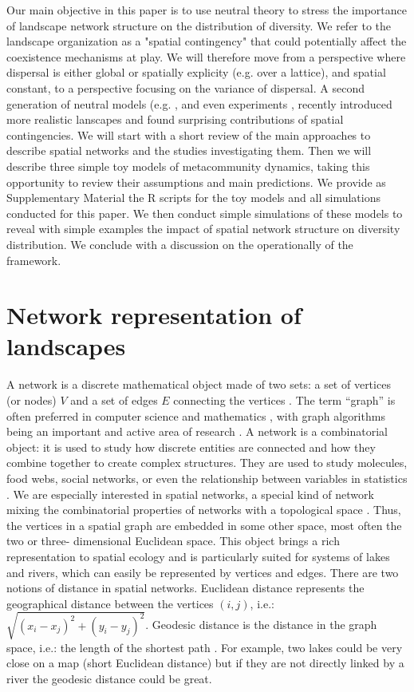 \documentclass[12pt]{article}
\begin{document}
Our main objective in this paper is to use neutral theory to stress the
importance of landscape network structure on the distribution of diversity. We
refer to the landscape organization as a "spatial contingency"
\parencite{Peres-Neto2013} that could potentially affect the coexistence
mechanisms at play. We will therefore move from a perspective where dispersal is
either global or spatially explicity (e.g. over a lattice), and spatial
constant, to a perspective focusing on the variance of dispersal. A second
generation of neutral models (e.g. \textcite{Economo2008,
Economo2011,Desjardins2012a,Desjardins2012b}, and even experiments
\parencite{Altermat2012}, recently introduced more realistic lanscapes and found
surprising contributions of spatial contingencies. We will start with a short
review of the main approaches to describe spatial networks and the studies
investigating them. Then we will describe three simple toy models of
metacommunity dynamics, taking this opportunity to review their assumptions and
main predictions. We provide as Supplementary Material the R scripts for the toy
models and all simulations conducted for this paper. We then conduct simple
simulations of these models to reveal with simple examples the impact of spatial network structure on
diversity distribution. We conclude with a discussion on the operationally of
the framework.

\section{Network representation of landscapes}

A network is a discrete mathematical object made of two sets: a set of
vertices (or nodes) $V$ and a set of edges $E$ connecting the vertices
\cite{new10}. The term ``graph'' is often preferred in computer science and
mathematics \cite{gro06}, with graph algorithms being an important and active
area of research \cite{sed01}. A network is a combinatorial object: it is
used to study how discrete entities are connected and how they combine
together to create complex structures. They are used to study molecules, food
webs, social networks, or even the relationship between variables in
statistics \cite{wri21,new10}. We are especially interested in spatial
networks, a special kind of network mixing the combinatorial properties of
networks with a topological space \cite{kob94}. Thus, the vertices in a
spatial graph are embedded in some other space, most often the two or three-
dimensional Euclidean space. This object brings a rich representation to
spatial ecology and is particularly suited for systems of lakes and rivers, which can
easily be represented by vertices and edges. There are two notions of
distance in spatial networks. Euclidean distance represents the geographical
distance between the vertices $(i, j)$, i.e.: $\sqrt{(x_i - x_j)^2 + (y_i - y_
j)^2}$. Geodesic distance is the distance in the graph space, i.e.: the
length of the shortest path \cite{dij59}. For example, two lakes could be
very close on a map (short Euclidean distance) but if they are not directly
linked by a river the geodesic distance could be great.
\end{document}
